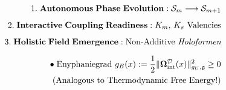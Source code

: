 \documentclass[preview]{standalone}
\begin{document}
\begin{align*}
\special{dvisvgm:raw <g id='unique000'>}1.\;\mathbf{Autonomous\;Phase\;Evolution:}\;\mathcal{S}_m \longrightarrow \mathcal{S}_{m+1}\\[5pt]2.\;\mathbf{Interactive\;Coupling\;Readiness:}\;K_m,\, K_s\text{ Valencies}\\[5pt]3.\;\mathbf{Holistic\;Field\;Emergence:}\;\text{Non-Additive }\textit{Holoformen}\\[6pt]\bullet\;\text{Enyphaniegrad }g_E(x) := \frac{1}{2}\|\mathbf{\Omega}_{\text{int}}^{\mathcal{D}}(x)\|_{g_U,\mathfrak{g}}^2 \ge 0\\\;\;\text{(Analogous to Thermodynamic Free Energy!)}\special{dvisvgm:raw </g>}
\end{align*}
\end{document}
